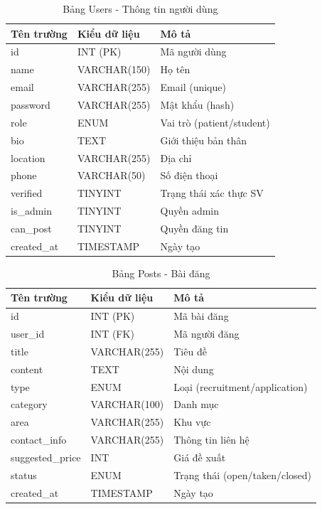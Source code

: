 \documentclass[a4paper,12pt]{report}
\begin{document}
\begin{table}[H]
\centering
\caption{Bảng Users - Thông tin người dùng}
\begin{tabular}{|l|l|l|}
\hline
\textbf{Tên trường} & \textbf{Kiểu dữ liệu} & \textbf{Mô tả} \\
\hline
id & INT (PK) & Mã người dùng \\
name & VARCHAR(150) & Họ tên \\
email & VARCHAR(255) & Email (unique) \\
password & VARCHAR(255) & Mật khẩu (hash) \\
role & ENUM & Vai trò (patient/student) \\
bio & TEXT & Giới thiệu bản thân \\
location & VARCHAR(255) & Địa chỉ \\
phone & VARCHAR(50) & Số điện thoại \\
verified & TINYINT & Trạng thái xác thực SV \\
is\_admin & TINYINT & Quyền admin \\
can\_post & TINYINT & Quyền đăng tin \\
created\_at & TIMESTAMP & Ngày tạo \\
\hline
\end{tabular}
\end{table}

\begin{table}[H]
\centering
\caption{Bảng Posts - Bài đăng}
\begin{tabular}{|l|l|l|}
\hline
\textbf{Tên trường} & \textbf{Kiểu dữ liệu} & \textbf{Mô tả} \\
\hline
id & INT (PK) & Mã bài đăng \\
user\_id & INT (FK) & Mã người đăng \\
title & VARCHAR(255) & Tiêu đề \\
content & TEXT & Nội dung \\
type & ENUM & Loại (recruitment/application) \\
category & VARCHAR(100) & Danh mục \\
area & VARCHAR(255) & Khu vực \\
contact\_info & VARCHAR(255) & Thông tin liên hệ \\
suggested\_price & INT & Giá đề xuất \\
status & ENUM & Trạng thái (open/taken/closed) \\
created\_at & TIMESTAMP & Ngày tạo \\
\hline
\end{tabular}
\end{table}
\end{document}

